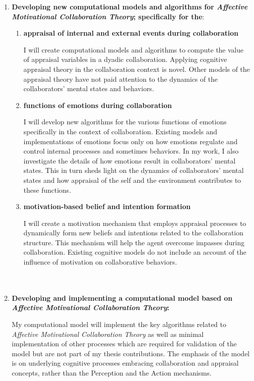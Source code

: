 \documentclass[12pt]{report}
\begin{document}
\begin{enumerate}
  \item \textbf{Developing new computational models and algorithms for
  \textit{Affective Motivational Collaboration Theory}; specifically for the}:
  
  \begin{enumerate}
  	\item \textbf{appraisal of internal and external events during
  	collaboration}

  	I will create computational models and algorithms to compute the value of
  	appraisal variables in a dyadic collaboration. Applying cognitive appraisal
  	theory in the collaboration context is novel. Other models of the appraisal
  	theory have not paid attention to the dynamics of the collaborators' mental
  	states and behaviors.

    \item \textbf{functions of emotions during collaboration}

  	I will develop new algorithms for the various functions of emotions
  	specifically in the context of collaboration. Existing models and
  	implementations of emotions focus only on how emotions regulate and control
  	internal processes and sometimes behaviors. In my work, I also investigate
  	the details of how emotions result in collaborators' mental states. This in
  	turn sheds light on the dynamics of collaborators' mental states and how
  	appraisal of the self and the environment contributes to these functions.

	\item \textbf{motivation-based belief and intention formation}
  
  	I will create a motivation mechanism that employs appraisal processes to
  	dynamically form new beliefs and intentions related to the collaboration
  	structure. This mechanism will help the agent overcome impasses during
  	collaboration. Existing cognitive models do not include an account of the
  	influence of motivation on collaborative behaviors.\\ \\ \\
  
  \end{enumerate}

  \item \textbf{Developing and implementing a computational model based on
  \textit{Affective Motivational Collaboration Theory}:}

  My computational model will implement the key algorithms related to
  \textit{Affective Motivational Collaboration Theory} as well as minimal
  implementation of other processes which are required for validation of the
  model but are not part of my thesis contributions. The emphasis of the model
  is on underlying cognitive processes embracing collaboration and appraisal
  concepts, rather than the Perception and the Action mechanisms.


\end{enumerate}
\end{document}
